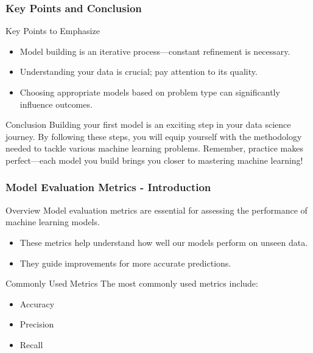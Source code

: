 \documentclass[aspectratio=169]{beamer}
\begin{document}
\begin{frame}
    \frametitle{Key Points and Conclusion}
    \begin{block}{Key Points to Emphasize}
        \begin{itemize}
            \item Model building is an iterative process—constant refinement is necessary.
            \item Understanding your data is crucial; pay attention to its quality.
            \item Choosing appropriate models based on problem type can significantly influence outcomes.
        \end{itemize}
    \end{block}
    
    \begin{block}{Conclusion}
        Building your first model is an exciting step in your data science journey. By following these steps, you will equip yourself with the methodology needed to tackle various machine learning problems. Remember, practice makes perfect—each model you build brings you closer to mastering machine learning!
    \end{block}
\end{frame}

\begin{frame}[fragile]
    \frametitle{Model Evaluation Metrics - Introduction}
    \begin{block}{Overview}
        Model evaluation metrics are essential for assessing the performance of machine learning models. 
        \begin{itemize}
            \item These metrics help understand how well our models perform on unseen data.
            \item They guide improvements for more accurate predictions.
        \end{itemize}
    \end{block}
    \begin{block}{Commonly Used Metrics}
        The most commonly used metrics include:
        \begin{itemize}
            \item Accuracy
            \item Precision
            \item Recall
        \end{itemize}
    \end{block}
\end{frame}
\end{document}
